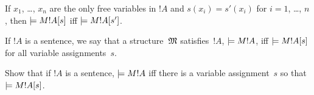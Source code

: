 \documentclass[syntax-and-semantics]{subfiles}
\begin{document}
\begin{prop}
If $x_1$, \dots, $x_n$ are the only free variables in $!A$ and $s(x_i)
= s'(x_i)$ for $i = 1$, \dots, $n$, then $\models{M}{!A}[s]$ iff
$\models{M}{!A}[s']$.
\end{prop}


\begin{defn}
If $!A$ is a sentence, we say that a structure~$\mathfrak M$
satisfies~$!A$, $\models{M}{!A}$, iff $\models{M}{!A}[s]$ for all variable
assignments~$s$.
\end{defn}

\begin{prob}
Show that if $!A$ is a sentence, $\models{M}{!A}$ iff there is a variable
assignment~$s$ so that $\models{M}{!A}[s]$.
\end{prob}
\end{document}
